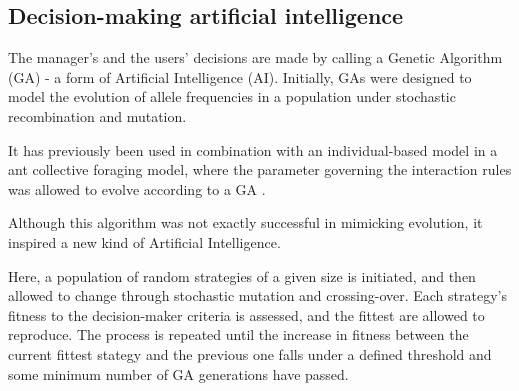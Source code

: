 \documentclass[12pt,a4paper]{article}
\begin{document}
%

\subsection{Decision-making artificial intelligence}

The manager's and the users' decisions are made by calling a Genetic Algorithm (GA) - a form of Artificial Intelligence (AI).
Initially, GAs were designed to model the evolution of allele frequencies in a population under stochastic recombination and mutation. 


It has previously been used in combination with an individual-based model in a ant collective foraging model, where the parameter governing the interaction rules was allowed to evolve according to a GA \citep{hamblin2013practical}.


Although this algorithm was not exactly successful in mimicking evolution, it inspired a new kind of Artificial Intelligence.

Here, a population of random strategies of a given size is initiated, and then allowed to change through stochastic mutation and crossing-over. 
Each strategy's fitness to the decision-maker criteria is assessed, and the fittest are allowed to reproduce.
The process is repeated until the increase in fitness between the current fittest stategy and the previous one falls under a defined threshold and some minimum number of GA generations have passed.
\end{document}
